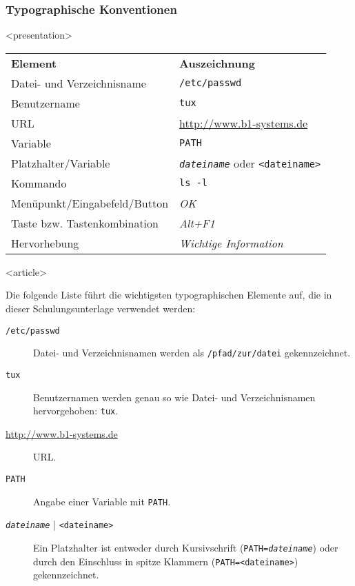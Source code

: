\begin{frame}[fragile]
\frametitle<presentation>{Typographische Konventionen}


\mode
<presentation>
\small
\begin{block}{}
\begin{center}
\begin{tabularx}{\textwidth}{lX}
\textbf{Element} & \textbf{Auszeichnung}\\
Datei- und Verzeichnisname & \texttt{/etc/passwd}\\
Benutzername & \texttt{tux} \\
URL & \url{http://www.b1-systems.de} \\
Variable & \texttt{PATH} \\
Platzhalter/Variable & \texttt{\textit{dateiname}} oder \texttt{<dateiname>} \\
Kommando & \texttt{ls -l} \\
Menüpunkt/Eingabefeld/Button & \textit{OK} \\
Taste bzw. Tastenkombination & \textit{Alt+F1} \\
Hervorhebung & \emph{Wichtige Information} \\
\end{tabularx}
\end{center}
\end{block}
\normalsize


\mode
<article>

Die folgende Liste führt die wichtigsten typographischen Elemente auf, die in dieser Schulungsunterlage verwendet werden:

\begin{description}
\item[\texttt{/etc/passwd}] Datei- und Verzeichnisnamen werden als \texttt{/pfad/zur/datei} gekennzeichnet.

\item[\texttt{tux}] Benutzernamen werden genau so wie Datei- und Verzeichnisnamen hervorgehoben: \texttt{tux}.

\item[\url{http://www.b1-systems.de}] URL.

\item[\texttt{PATH}] Angabe einer Variable mit \texttt{PATH}.

\item[\texttt{\textit{dateiname}} | \texttt{<dateiname>}] Ein Platzhalter ist entweder durch Kursivschrift\newline
  (\texttt{PATH=\textit{dateiname}}) oder durch den Einschluss in spitze Klammern\newline
  (\texttt{PATH=<dateiname>}) gekennzeichnet.


\end{description}
\end{frame}
